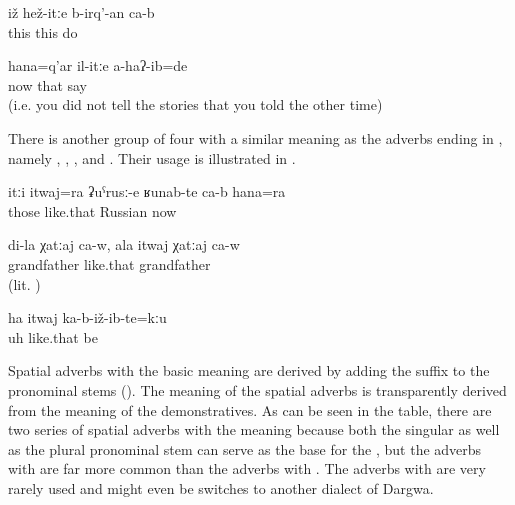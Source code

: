 \begin{exe}
	\ex	\label{ex:It must be done like this}
	\gll	iž	hež-itːe	b-irq'-an ca-b\\
		this	this	do \\
	\glt	{}

	\ex	\label{ex:But now you did not say this}
	\gll	hana=q'ar	il-itːe	a-haʔ-ib=de\\
		now	that	say\\
	\glt	{} (i.e. you did not tell the stories that you told the other time)
\end{exe}

There is another group of four  with a similar meaning as the adverbs ending in , namely , , , and  . Their usage is illustrated in .

\begin{exe}
	\ex	\label{ex:They are also like this, like Russians, even now}
	\gll	itːi	itwaj=ra	ʡuˁrusː-e	ʁunab-te	ca-b	hana=ra\\
		those	like.that	Russian	 		now\\
	\glt	{}

	\ex	\label{ex:(He) is my (real) grandfather. For you he is only an old man (lit. he is like a grandfather of yours)}
	\gll	di-la	χatːaj	ca-w,	ala	itwaj	χatːaj	ca-w\\
			grandfather			like.that	grandfather	\\
	\glt	{} (lit. )

	\ex	\label{ex:Uh, and so he did not marry}
	\gll	ha	itwaj	ka-b-iž-ib-te=kːu\\
		uh	like.that	be\\
	\glt	{}
\end{exe}

Spatial adverbs with the basic meaning  are derived by adding the suffix  to the pronominal stems (). The meaning of the spatial adverbs is transparently derived from the meaning of the demonstratives. As can be seen in the table, there are two series of spatial adverbs with the meaning  because both the singular as well as the plural pronominal stem can serve as the base for the , but the adverbs with  are far more common than the adverbs with . The adverbs with  are very rarely used and might even be switches to another dialect of Dargwa.

